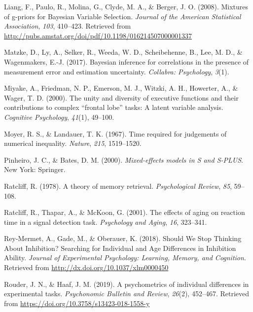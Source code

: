 \documentclass[
  ,man]{apa6}
\newlength{\cslhangindent}
\newlength{\cslentryspacingunit} %
\newenvironment{CSLReferences}[2] %
 {%
  \setlength{\parindent}{0pt}
  \ifodd #1
  \let\oldpar\par
  \def\par{\hangindent=\cslhangindent\oldpar}
  \fi
  \setlength{\parskip}{#2\cslentryspacingunit}
 }%
 {}
\begin{document}
\begin{CSLReferences}{1}{0}
\leavevmode{}%
Liang, F., Paulo, R., Molina, G., Clyde, M. A., \& Berger, J. O. (2008). Mixtures of g-priors for {Bayesian Variable Selection}. \emph{Journal of the American Statistical Association}, \emph{103}, 410--423. Retrieved from \url{http://pubs.amstat.org/doi/pdf/10.1198/016214507000001337}

\leavevmode{}%
Matzke, D., Ly, A., Selker, R., Weeda, W. D., Scheibehenne, B., Lee, M. D., \& Wagenmakers, E.-J. (2017). Bayesian inference for correlations in the presence of measurement error and estimation uncertainty. \emph{Collabra: Psychology}, \emph{3}(1).

\leavevmode{}%
Miyake, A., Friedman, N. P., Emerson, M. J., Witzki, A. H., Howerter, A., \& Wager, T. D. (2000). The unity and diversity of executive functions and their contributions to complex {``frontal lobe''} tasks: {A} latent variable analysis. \emph{Cognitive Psychology}, \emph{41}(1), 49--100.

\leavevmode{}%
Moyer, R. S., \& Landauer, T. K. (1967). Time required for judgements of numerical inequality. \emph{Nature}, \emph{215}, 1519--1520.

\leavevmode{}%
Pinheiro, J. C., \& Bates, D. M. (2000). \emph{Mixed-effects models in {S} and {S-PLUS}}. {New York}: {Springer}.

\leavevmode{}%
Ratcliff, R. (1978). A theory of memory retrieval. \emph{Psychological Review}, \emph{85}, 59--108.

\leavevmode{}%
Ratcliff, R., Thapar, A., \& McKoon, G. (2001). The effects of aging on reaction time in a signal detection task. \emph{Psychology and Aging}, \emph{16}, 323--341.

\leavevmode{}%
Rey-Mermet, A., Gade, M., \& Oberauer, K. (2018). Should {We Stop Thinking About Inhibition}? {Searching} for {Individual} and {Age Differences} in {Inhibition Ability}. \emph{Journal of Experimental Psychology: Learning, Memory, and Cognition}. Retrieved from \url{http://dx.doi.org/10.1037/xlm0000450}

\leavevmode{}%
Rouder, J. N., \& Haaf, J. M. (2019). A psychometrics of individual differences in experimental tasks. \emph{Psychonomic Bulletin and Review}, \emph{26}(2), 452--467. Retrieved from \url{https://doi.org/10.3758/s13423-018-1558-y}


\end{CSLReferences}
\end{document}
